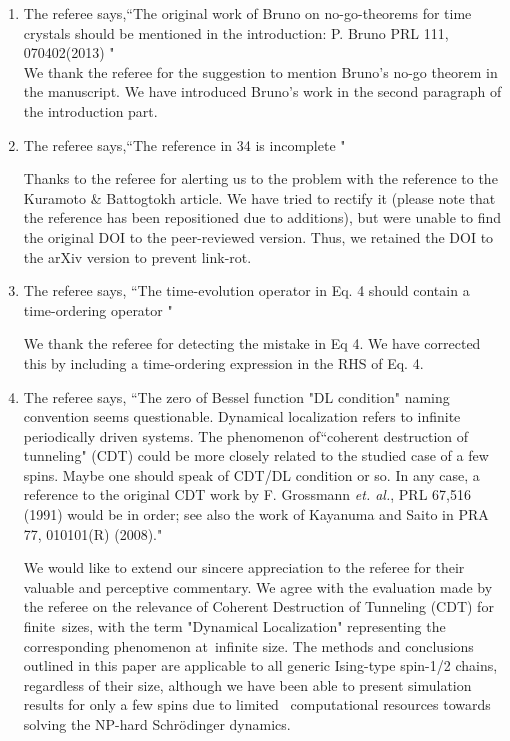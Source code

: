 \documentclass[aps,prb,reprint,showpacs,floatfix,superscriptaddress, onecolumn, nofootinbib, 9pt]{revtex4-2}
\newcommand{\ar}[1]{{\color{blue}#1}} %
\begin{document}
\begin{enumerate}
    \item The referee says,``The original work of Bruno on no-go-theorems for time crystals should be mentioned in the introduction: P. Bruno PRL 111, 070402(2013) "\\

    \ar{
    We thank the referee for the suggestion to mention Bruno's no-go theorem in the manuscript. We have introduced Bruno's work in the second paragraph of the introduction part.
    }
    \item The referee says,``The reference in 34 is incomplete "

    \ar{    	
Thanks to the referee for alerting us to the problem with the reference to the Kuramoto \& Battogtokh article. We have tried to rectify it (please note that the reference has been repositioned due to additions), but were unable to find the original DOI to the peer-reviewed version. Thus, we retained the DOI to the arXiv version to prevent link-rot.}

    \item The referee says, ``The time-evolution operator in Eq. 4 should contain a time-ordering operator "

    \ar{
    We thank the referee for detecting the mistake in Eq 4. We have corrected this by including a time-ordering expression in the RHS of Eq. 4.
    }

    \item The referee says, ``The zero of Bessel function "DL condition" naming convention seems questionable. Dynamical localization refers to infinite periodically driven systems. The phenomenon of``coherent destruction of tunneling" (CDT) could be more closely related to the studied case of a few spins. Maybe one should speak of CDT/DL condition or so. In any case, a reference to the original CDT work by F. Grossmann \textit{et. al.}, PRL 67,516 (1991) would be in order; see also the work of Kayanuma and Saito in PRA 77, 010101(R) (2008)."\\

    \ar{
   We would like to extend our sincere appreciation to the referee for their valuable and perceptive commentary. We agree with the evaluation made by the referee on the relevance of Coherent Destruction of Tunneling (CDT) for  finite sizes, with the term "Dynamical Localization" representing the corresponding phenomenon at infinite size. The methods and conclusions outlined in this paper are applicable to all generic Ising-type spin-1/2 chains, regardless of their size, although we have been able to present simulation results for only a few spins due to limited  computational resources towards solving the NP-hard Schr\"odinger dynamics.
   
}
\end{enumerate}
\end{document}

